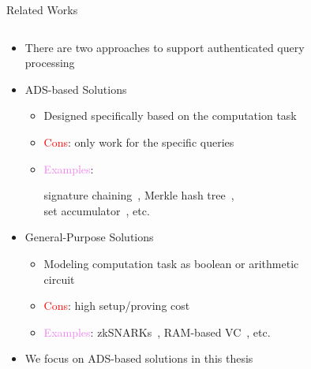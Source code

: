 \documentclass[xcolor={dvipsnames},aspectratio=169,10pt]{beamer}
\begin{document}
\begin{frame}{Related Works}
  \begin{columns}
    \begin{column}{0.8\linewidth}
      \begin{itemize}[<+->]
        \item There are two approaches to support authenticated query processing
        \item \alert{ADS-based Solutions}
          \begin{itemize}[<1->]
            \item Designed specifically based on the computation task
            \item {}
              \textcolor{Red}{Cons}: only work for the specific queries
            \item \textcolor{Violet}{Examples}:
              \parbox[t]{\linewidth}{%
                \strut%
                signature chaining~\cite{10.1109/ICDE.2004.1320027}, Merkle hash tree~\cite{10.1007/0-387-34805-0_21}, \\ set accumulator~\cite{10.1145/2660267.2660373}, etc.%
                \strut%
              }%
          \end{itemize}
        \item \alert{General-Purpose Solutions}
          \begin{itemize}[<1->]
            \item Modeling computation task as boolean or arithmetic circuit
            \item {}
              \textcolor{Red}{Cons}: high setup/proving cost
            \item \textcolor{Violet}{Examples}: zkSNARKs~\cite{10.1109/sp.2013.47}, RAM-based VC~\cite{10.1145/2517349.2522733}, etc.
          \end{itemize}
        \item We focus on \alert{ADS-based solutions} in this thesis
      \end{itemize}
    \end{column}%
    \begin{column}{0.2\linewidth}
      \begin{figure}
      \end{figure}%
    \end{column}
  \end{columns}
\end{frame}
\end{document}
